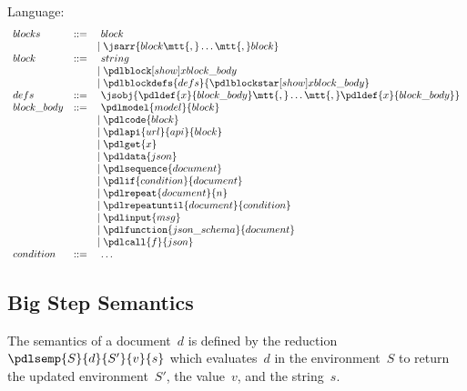 \documentclass{article}
\begin{document}
Language:
$$
\begin{array}{lcl}
    \mit{blocks} & ::= &\ 
    \mit{block}
    \\ &&\mid
    \jsarr{\mit{block}\mtt{,} \dots\mtt{,} \mit{block}}
    \\
    \mit{block} & ::= &\
    \mit{string}
    \\ &&\mid
    \pdlblock[\mit{show}]{x}{\mit{block\_body}}
    \\ &&\mid
    \pdlblockdefs{\mit{defs}}{\pdlblockstar[\mit{show}]{x}{\mit{block\_body}}}
    \\
    \mit{defs} & ::= &\
    \jsobj{\pdldef{x}{\mit{block\_body}}\mtt{,} \dots\mtt{,}\pdldef{x}{\mit{block\_body}}}
    \\
    \mit{block\_body} & ::= &\ 
    \pdlmodel{\mit{model}}{\mit{block}}
    \\ &&\mid
    \pdlcode{\mit{block}}
    \\ &&\mid
    \pdlapi{\mit{url}}{\mit{api}}{\mit{block}}
    \\ &&\mid
    \pdlget{\mit{x}}
    \\ &&\mid
    \pdldata{\mit{json}}
    \\ &&\mid
    \pdlsequence{\mit{document}}
    \\ &&\mid
    \pdlif{\mit{condition}}{\mit{document}}
    \\ &&\mid
    \pdlrepeat{\mit{document}}{\mit{n}}
    \\ &&\mid
    \pdlrepeatuntil{\mit{document}}{\mit{condition}}
    \\ &&\mid
    \pdlinput{\mit{msg}}
    \\ &&\mid
    \pdlfunction{\mit{json\_schema}}{\mit{document}}
    \\ &&\mid
    \pdlcall{f}{\mit{json}}
    \\
    \mit{condition} & ::= &\ \dots

\end{array}
$$

\subsection*{Big Step Semantics}

The semantics of a document~$d$ is defined by the reduction $\pdlsemp{S}{d}{S'}{v}{s}$ which evaluates~$d$ in the environment~$S$ to return the updated environment~$S'$, the value~$v$, and the string~$s$.
\end{document}
